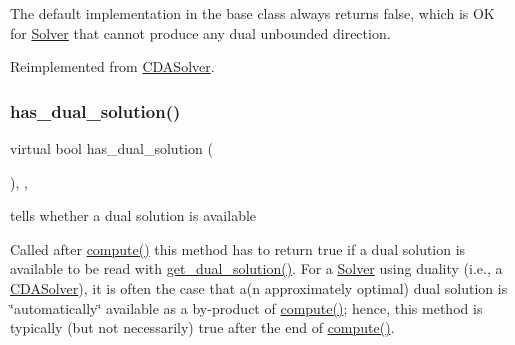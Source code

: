 The default implementation in the base class always returns false, which is OK for \mbox{\hyperlink{class_s_m_spp__di__unipi__it_1_1_solver}{Solver}} that cannot produce any dual unbounded direction. 

Reimplemented from \mbox{\hyperlink{class_s_m_spp__di__unipi__it_1_1_c_d_a_solver_a4247feaa72c255f28a2a71b5e634b60a}{C\+D\+A\+Solver}}.

\mbox{\label{class_s_m_spp__di__unipi__it_1_1_m_c_f_solver_ac179f31ab4f3e55a7f03b152d065edbd}} 
\subsubsection{\texorpdfstring{has\+\_\+dual\+\_\+solution()}{has\_dual\_solution()}}
{\footnotesize\ttfamily virtual bool has\+\_\+dual\+\_\+solution (\begin{DoxyParamCaption}\item[{void}]{ }\end{DoxyParamCaption})\hspace{0.3cm}{\ttfamily [inline]}, {\ttfamily [override]}, {\ttfamily [virtual]}}



tells whether a dual solution is available 

Called after \mbox{\hyperlink{class_s_m_spp__di__unipi__it_1_1_m_c_f_solver_afc8ff54ab05d22f4cca0fb0bfbeb7a49}{compute()}} this method has to return true if a dual solution is available to be read with \mbox{\hyperlink{class_s_m_spp__di__unipi__it_1_1_m_c_f_solver_a7ceb04914b5dcbb1cfd8f0e844b56014}{get\+\_\+dual\+\_\+solution()}}. For a \mbox{\hyperlink{class_s_m_spp__di__unipi__it_1_1_solver}{Solver}} using duality (i.\+e., a \mbox{\hyperlink{class_s_m_spp__di__unipi__it_1_1_c_d_a_solver}{C\+D\+A\+Solver}}), it is often the case that a(n approximately optimal) dual solution is \char`\"{}automatically\char`\"{} available as a by-\/product of \mbox{\hyperlink{class_s_m_spp__di__unipi__it_1_1_m_c_f_solver_afc8ff54ab05d22f4cca0fb0bfbeb7a49}{compute()}}; hence, this method is typically (but not necessarily) true after the end of \mbox{\hyperlink{class_s_m_spp__di__unipi__it_1_1_m_c_f_solver_afc8ff54ab05d22f4cca0fb0bfbeb7a49}{compute()}}.

